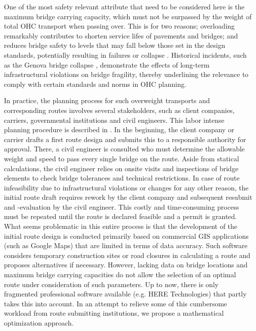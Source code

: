 One of the most safety relevant attribute that need to be considered here is the maximum bridge carrying capacity, which must not be surpassed by the weight of total OHC transport when passing over.
This is for two reasons; overloading remarkably contributes to shorten service lifes of pavements and bridges; and reduces bridge safety to levels that may fall below those set in the design standards, potentially resulting in failures or collapse \cite{fiorillo2018fragility}.
Historical incidents, such as the Genova bridge collapse \cite{Morgese.2020, MorandiNYTimes},  demonstrate the effects of long-term infrastructural violations on bridge fragility, thereby underlining the relevance to comply with certain standards and norms in OHC planning.

\par In practice, the planning process for such overweight transports and corresponding routes involves several stakeholders, such as client companies, carriers, governmental institutions and civil engineers.
This labor intense planning procedure is described in \cite{Osegueda.1999}. In the beginning, the client company or carrier drafts a first route design and submits this to a responsible authority for approval.
There, a civil engineer is consulted who must determine the allowable weight and speed to pass every single bridge on the route.
Aside from statical calculations, the civil engineer relies on onsite visits and inspections of bridge elements to check bridge tolerances and technical restrictions.
In case of route infeasibility due to infrastructural violations or changes for any other reason, the initial route draft requires rework by the client company and subsequent resubmit and -evaluation by the civil engineer.
This costly and time-consuming process must be repeated until the route is declared feasible and a permit is granted.
What seems problematic in this entire process is that the development of the initial route design is conducted primarily based on commercial GIS applications (such as Google Maps) that are limited in terms of data accuracy.
Such software considers temporary construction sites or road closures in calculating a route and proposes alternatives if necessary.
However, lacking data on bridge locations and maximum bridge carrying capacities do not allow the selection of an optimal route under consideration of such parameters.
Up to now, there is only fragmented professional software available (e.g. HERE Technologies) that partly takes this into account.
In an attempt to relieve some of this cumbersome workload from route submitting institutions, we propose a mathematical optimization approach.
